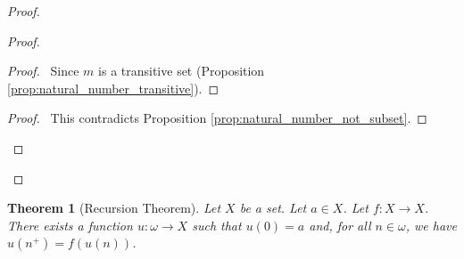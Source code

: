 \documentclass{report}
\let\qed\relax
\newtheorem{thm}[ax]{Theorem}
\theoremstyle{definition}
\begin{document}
\begin{proof}
\pf
{}
\begin{proof}
	\begin{proof}
		\pf\ Since $m$ is a transitive set (Proposition \ref{prop:natural_number_transitive}).
	\end{proof}
	\qedstep
	\begin{proof}
		\pf\ This contradicts Proposition \ref{prop:natural_number_not_subset}.
	\end{proof}
\end{proof}
\qed
\end{proof}

\begin{thm}[Recursion Theorem]
Let $X$ be a set. Let $a \in X$. Let $f : X \rightarrow X$. There exists a function $u : \omega \rightarrow X$ such that $u(0) = a$ and, for all $n \in \omega$, we have $u(n^+) = f(u(n))$.
\end{thm}
\end{document}
